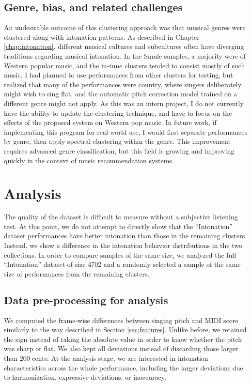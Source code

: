 \subsection{Genre, bias, and related challenges}
An undesirable outcome of this clustering approach was that musical genres were clustered along with intonation patterns. As described in Chapter \ref{chap:intonation}, different musical cultures and subcultures often have diverging traditions regarding musical intonation. In the Smule samples, a majority were of Western popular music, and the in-tune clusters tended to consist mostly of such music. I had planned to use performances from other clusters for testing, but realized that many of the performances were country, where singers deliberately might wish to sing flat, and the automatic pitch correction model trained on a different genre might not apply. As this was an intern project, I do not currently have the ability to update the clustering technique, and have to focus on the effects of the proposed system on Western pop music. In future work, if implementing this program for real-world use, I would first separate performances by genre, then apply spectral clustering within the genre. This improvement requires advanced genre classification, but this field is growing and improving quickly in the context of music recommendation systems.  

\section{Analysis}

The quality of the dataset is difficult to measure without a subjective listening test. At this point, we do not attempt to directly show that the ``Intonation'' dataset performances have better intonation than those in the remaining clusters. Instead, we show a difference in the intonation behavior distributions in the two collections. In order to compare samples of the same size, we analyzed the full ``Intonation'' dataset of size 4702 and a randomly selected a sample of the same size of performances from the remaining clusters.

\subsection{Data pre-processing for analysis}
We computed the frame-wise differences between singing pitch and MIDI score similarly to the way described in Section \ref{sec:features}. Unlike before, we retained the sign instead of taking the absolute value in order to know whether the pitch was sharp or flat. We also kept all deviations instead of discarding those larger than 200 cents: At the analysis stage, we are interested in intonation characteristics across the whole performance, including the larger deviations due to harmonization, expressive deviations, or inaccuracy. 

